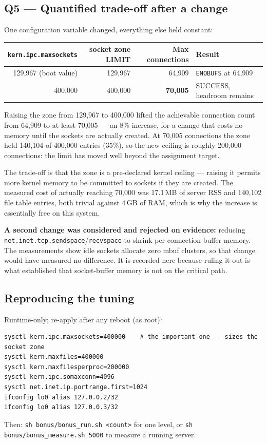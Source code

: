\documentclass[11pt,a4paper]{article}
\newcommand{\cmd}[1]{\texttt{\small #1}}
\begin{document}
\subsection{Q5 --- Quantified trade-off after a change}

One configuration variable changed, everything else held constant:

\begin{center}\small
\begin{tabular}{rrrl}
\toprule
\cmd{kern.ipc.maxsockets} & socket zone LIMIT & Max connections & Result \\
\midrule
129{,}967 (boot value) & 129{,}967 & 64{,}909 & \cmd{ENOBUFS} at 64{,}909 \\
400{,}000              & 400{,}000 & \textbf{70{,}005} & SUCCESS, headroom remains \\
\bottomrule
\end{tabular}
\end{center}

Raising the zone from 129{,}967 to 400{,}000 lifted the achievable connection
count from 64{,}909 to at least 70{,}005 --- an 8\% increase, for a change that
costs no memory until the sockets are actually created. At 70{,}005 connections
the zone held 140{,}104 of 400{,}000 entries (35\%), so the new ceiling is
roughly 200{,}000 connections: the limit has moved well beyond the assignment
target.

The trade-off is that the zone is a pre-declared kernel ceiling --- raising it
permits more kernel memory to be committed to sockets if they are created. The
measured cost of actually reaching 70{,}000 was 17.1\,MB of server RSS and
140{,}102 file table entries, both trivial against 4\,GB of RAM, which is why
the increase is essentially free on this system.

\textbf{A second change was considered and rejected on evidence:} reducing
\cmd{net.inet.tcp.sendspace}/\cmd{recvspace} to shrink per-connection buffer
memory. The measurements show idle sockets allocate zero mbuf clusters, so that
change would have measured no difference. It is recorded here because ruling it
out is what established that socket-buffer memory is not on the critical path.

\subsection{Reproducing the tuning}

Runtime-only; re-apply after any reboot (as root):
\begin{Verbatim}[fontsize=\small,frame=single]
sysctl kern.ipc.maxsockets=400000    # the important one -- sizes the socket zone
sysctl kern.maxfiles=400000
sysctl kern.maxfilesperproc=200000
sysctl kern.ipc.somaxconn=4096
sysctl net.inet.ip.portrange.first=1024
ifconfig lo0 alias 127.0.0.2/32
ifconfig lo0 alias 127.0.0.3/32
\end{Verbatim}
Then: \cmd{sh bonus/bonus\_run.sh <count>} for one level, or
\cmd{sh bonus/bonus\_measure.sh 5000} to measure a running server.
\end{document}
